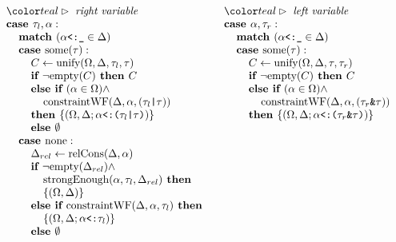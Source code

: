 \documentclass[acmsmall]{acmart}
\begin{document}
\begin{figure*}[h]
\[\begin{array}[t]{@{} l}
    \I \C{right variable}
    \\
    \I \B{case } \tau_l, \alpha : 
    \\
    \I\I \B{match } (\code{$\alpha$<:\_} \in \Delta)
    \\
    \I\I \B{case } \F{some}(\tau) :
    \\
    \I\I\I C \leftarrow \F{unify}(\Omega, \Delta, \tau_l, \tau)
    \\
    \I\I\I \B{if } \neg \F{empty}(C) \B{ then } C
    \\
    \I\I\I \B{else if } (\alpha \in \Omega) \wedge 
    \\
    \I\I\I\I \F{constraintWF}(\Delta, \alpha, (\code{$\tau_l$|$\tau$})) 
    \\
    \I\I\I \B{then } \{(\Omega, \Delta;\code{$\alpha$<:($\tau_l$|$\tau$)})\}
    \\
    \I\I\I \B{else } \emptyset 
    \\
    \I\I \B{case } \F{none} :
    \\
    \I\I\I \Delta_{rel} \leftarrow \F{relCons}(\Delta, \alpha)  
    \\
    \I\I\I \B{if } \neg \F{empty}(\Delta_{rel}) \wedge 
    \\
    \I\I\I\I \F{strongEnough}(\alpha, \tau_l, \Delta_{rel}) \B{ then }
    \\
    \I\I\I\I \{(\Omega, \Delta)\}
    \\
    \I\I\I \B{else if } \F{constraintWF}(\Delta, \alpha, \tau_l) \B{ then }
    \\
    \I\I\I\I \{(\Omega, \Delta;\code{$\alpha$<:$\tau_l$})\}
    \\
    \I\I\I \B{else } \emptyset 
\end{array}
\begin{array}[t]{@{} l}
  \I \C{left variable}
  \\
  \I \B{case } \alpha, \tau_r : 
  \\
  \I\I \B{match } (\code{$\alpha$<:\_} \in \Delta)
  \\
  \I\I \B{case } \F{some}(\tau) :
  \\
  \I\I\I C \leftarrow \F{unify}(\Omega, \Delta, \tau, \tau_r)
  \\
  \I\I\I \B{if } \neg \F{empty}(C) \B{ then } C
  \\
  \I\I\I \B{else if } (\alpha \in \Omega) \wedge 
  \\
  \I\I\I\I \F{constraintWF}(\Delta, \alpha, (\code{$\tau_r$\&$\tau$})) 
  \\
  \I\I\I \B{then } \{(\Omega, \Delta;\code{$\alpha$<:($\tau_r$\&$\tau$)})\}

\end{array}\]
\end{figure*}
\end{document}
